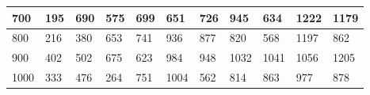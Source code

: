 \documentclass[10pt,letterpaper]{article}
\begin{document}
\begin{center}
\begin{table}
\begin{tabular} { |m{0.5cm}|m{1.3cm}|m{1.3cm}|m{1.3cm}|m{1.3cm}|m{1.3cm}|m{1.3cm}|m{1.3cm}|m{1.3cm}|m{1.3cm}|m{1.3cm}|}
\hline
\cellcolor{Gray}700 & \Large 195 & \Large 690 & \Large 575 & \Large 699 & \Large 651 & \Large 726 & \Large 945 & \Large 634 & \Large 1222 & \Large 1179 \\
\hline
\cellcolor{Gray}800 & \Large 216 & \Large 380 & \Large 653 & \Large 741 & \Large 936 & \Large 877 & \Large 820 & \Large 568 & \Large 1197 & \Large 862 \\
\hline
\cellcolor{Gray}900 & \Large 402 & \Large 502 & \Large 675 & \Large 623 & \Large 984 & \Large 948 & \Large 1032 & \Large 1041 & \Large 1056 & \Large 1205 \\
\hline
\cellcolor{Gray}1000 & \Large 333 & \Large 476 & \Large 264 & \Large 751 & \Large 1004 & \Large 562 & \Large 814 & \Large 863 & \Large 977 & \Large 878 \\
\hline
\end{tabular} \\
\end{table}
\end{center}
\newpage 
{}
\end{document}
